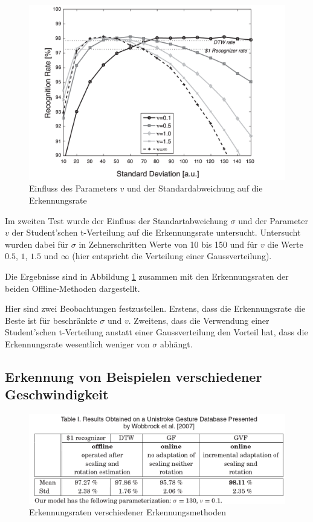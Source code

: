 \documentclass{llncs}
\begin{document}
\begin{figure}
\centering
\includegraphics[width=0.7\linewidth]{../Bilder/Fig4}
\caption{Einfluss des Parameters $v$ und der Standardabweichung auf die Erkennungsrate}
\label{fig:Fig}
\end{figure}

Im zweiten Test wurde der Einfluss der Standartabweichung $\sigma$ und der Parameter $v$ der Student'schen t-Verteilung auf die Erkennungsrate untersucht. Untersucht wurden dabei für $\sigma$ in Zehnerschritten Werte von 10 bis 150 und für $v$ die Werte $0.5$, $1$, $1.5$ und $\infty$ (hier entspricht die Verteilung einer Gaussverteilung).

Die Ergebnisse sind in Abbildung \ref{fig:Fig} zusammen mit den Erkennungsraten der beiden Offline-Methoden dargestellt.


Hier sind zwei Beobachtungen festzustellen. Erstens, dass die Erkennungsrate die Beste ist für beschränkte $\sigma$ und $v$. Zweitens, dass die Verwendung einer Student'schen t-Verteilung anstatt einer Gaussverteilung den Vorteil hat, dass die Erkennungsrate wesentlich weniger von $\sigma$ abhängt.

\subsection{Erkennung von Beispielen verschiedener Geschwindigkeit}
\begin{figure}
\centering
\includegraphics[width=0.7\linewidth]{../Bilder/Tabelle1}
\caption{Erkennungsraten verschiedener Erkennungsmethoden}
\label{fig:Tabelle1}
\end{figure}
\end{document}
